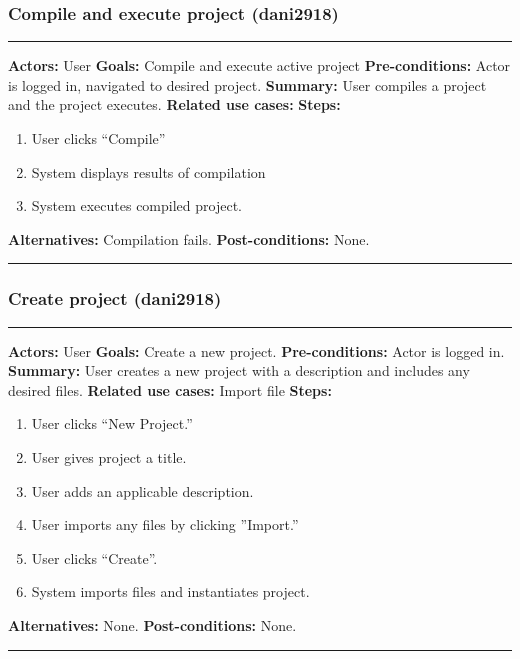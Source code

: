 \documentclass[11pt]{report}
\begin{document}
\subsubsection{Compile and execute project (dani2918)}
\vspace{2pt}
\hrule
\vspace{8pt}
 \textbf{Actors:} User \newline
\textbf{Goals:} Compile and execute active project\newline
 \textbf{Pre-conditions:} Actor is logged in, navigated to desired project.  \newline
\textbf{Summary:} User compiles a project and the project executes.\newline
\textbf{Related use cases:} \newline
\textbf{Steps:} \begin{enumerate}
  \item User clicks ``Compile''
  \item System displays results of compilation
  \item System executes compiled project.
 \end{enumerate}
 \textbf{Alternatives:} Compilation fails. \newline
 \textbf{Post-conditions:} None. \newline
\vspace{8pt}
\hrule
\newpage


\subsubsection{Create project (dani2918)}
\vspace{2pt}
\hrule
\vspace{8pt}
 \textbf{Actors:} User \newline
\textbf{Goals:} Create a new project. \newline
 \textbf{Pre-conditions:} Actor is logged in.  \newline
\textbf{Summary:} User creates a new project with a description and includes any desired files. \newline
\textbf{Related use cases:} Import file \newline
\textbf{Steps:} \begin{enumerate}
  \item User clicks ``New Project.''
  \item User gives project a title.
  \item User adds an applicable description.
  \item User imports any files by clicking ''Import.''
  \item User clicks ``Create''.
  \item System imports files and instantiates project.
 \end{enumerate}
 \textbf{Alternatives:} None. \newline
 \textbf{Post-conditions:} None. \newline
\vspace{8pt}
\hrule
\newpage
\end{document}
